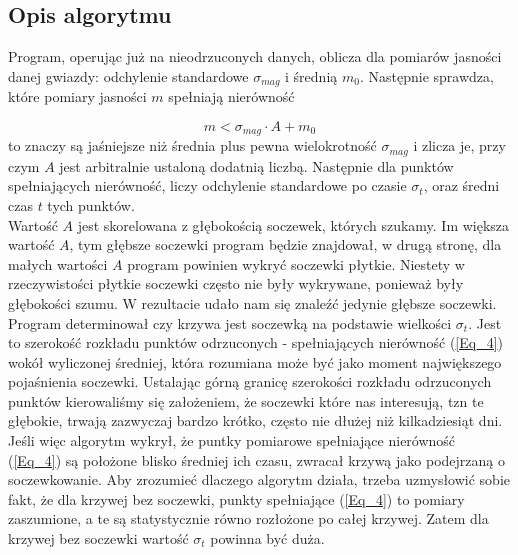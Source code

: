 \documentclass[a4paper,11pt]{article}
\newcommand{\ak}{\hspace{0.7 cm}}
\begin{document}
\begin{enumerate}
\begin{enumerate}
\subsection{Opis algorytmu}
\ak Program, operując już na nieodrzuconych danych, oblicza dla pomiarów jasności danej gwiazdy: odchylenie standardowe  $\sigma_{mag}$ i średnią $m_0$. Następnie  sprawdza, które pomiary jasności $m$ spełniają nierówność

\begin{equation}
m<\sigma_{mag}\cdot A+m_0 
\label{Eq_4}
\end{equation}
to znaczy są jaśniejsze niż średnia plus pewna wielokrotność $\sigma_{mag}$ i zlicza je, przy czym $A$ jest arbitralnie ustaloną dodatnią liczbą. Następnie dla punktów spełniających nierówność, liczy odchylenie standardowe po czasie $\sigma_t$, oraz średni czas $t$ tych punktów. \\ 
Wartość $A$ jest skorelowana z głębokością soczewek, których szukamy. Im większa wartość $A$, tym głębsze soczewki program będzie znajdował, w drugą stronę, dla małych wartości $A$ program powinien wykryć soczewki płytkie. Niestety w rzeczywistości płytkie soczewki często nie były wykrywane, ponieważ były głębokości szumu. W rezultacie udało nam się znaleźć jedynie głębsze soczewki.  \\

\ak Program determinował czy krzywa jest soczewką na podstawie wielkości $\sigma_t$. Jest to szerokość rozkładu punktów odrzuconych - spełniających nierówność 
		(\ref{Eq_4}) wokół wyliczonej średniej, która rozumiana może być jako moment największego pojaśnienia soczewki. Ustalając górną granicę szerokości rozkładu odrzuconych punktów kierowaliśmy się założeniem, że soczewki które nas interesują, tzn te głębokie, trwają zazwyczaj bardzo krótko, często nie dłużej niż kilkadziesiąt dni. Jeśli więc algorytm wykrył, że puntky pomiarowe spełniające nierówność (\ref{Eq_4}) są położone blisko średniej ich czasu, zwracał krzywą jako podejrzaną o soczewkowanie. Aby zrozumieć dlaczego algorytm działa, trzeba uzmysłowić sobie fakt, że dla krzywej bez soczewki, punkty spełniające (\ref{Eq_4}) to pomiary zaszumione, a te są statystycznie równo rozłożone po całej krzywej. Zatem dla krzywej bez soczewki wartość $\sigma_t$ powinna być duża.


\end{enumerate}
\end{enumerate}
\end{document}
